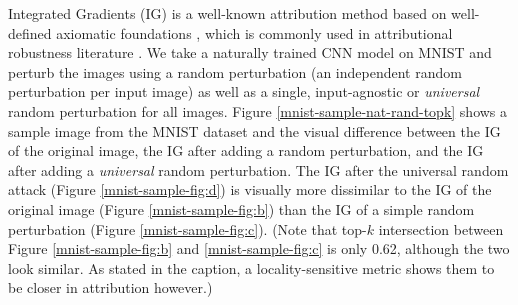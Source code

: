\documentclass[letterpaper]{article} %
\begin{document}
Integrated Gradients (IG) is a well-known attribution method based on well-defined axiomatic foundations \citep{SundararajanTY17}, which is commonly used in attributional robustness literature \citep{chen2019robust,sarkar2020enhanced}. 
We take a naturally trained CNN model on MNIST and perturb the images using a random perturbation (an independent random perturbation per input image) as well as a single, input-agnostic or \emph{universal} random perturbation for all images. Figure \ref{mnist-sample-nat-rand-topk} shows a sample image from the MNIST dataset and the visual difference between the IG of the original image, the IG after adding a random perturbation, and the IG after adding a \emph{universal} random perturbation. The IG after the universal random attack (Figure \ref{mnist-sample-fig:d}) is visually more dissimilar to the IG of the original image (Figure \ref{mnist-sample-fig:b}) than the IG of a simple random perturbation (Figure \ref{mnist-sample-fig:c}). (Note that top-$k$ intersection between Figure \ref{mnist-sample-fig:b} and \ref{mnist-sample-fig:c} is only 0.62, although the two look similar. As stated in the caption, a locality-sensitive metric shows them to be closer in attribution however.)

\end{document}
